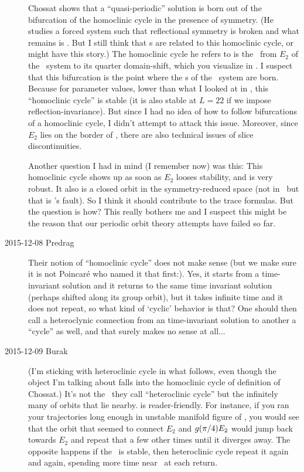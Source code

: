 \begin{description}
Chossat shows that a ``quasi-periodic'' solution is born
out of the bifurcation of the homoclinic cycle in the presence of
 symmetry.
(He studies a forced system such that reflectional symmetry is broken and
what remains is . But I still think that \rpo s are related to
this homoclinic cycle,  or  might have
this story.)
The homoclinic cycle he refers to is the
\hec\ from $E_2$ of the \KS\ system to its quarter
domain-shift, which you visualize in .
I suspect that this bifurcation is the point where the \rpo s of the
\KS\ system are born. Because for parameter values, lower than what
I looked at in , this ``homoclinic cycle'' is stable
(it is also stable at $L=22$ if we impose reflection-invariance).
But since I had no idea of how to follow bifurcations of a homoclinic
cycle, I didn't attempt to attack this issue. Moreover, since $E_2$
lies on the border of \fFslice, there are also technical issues of
slice discontinuities.

Another question I had in mind (I remember now) was this:
This homoclinic cycle shows up as soon as $E_2$ looses stability, and
is very robust. It also is a closed orbit in the symmetry-reduced
space (not in \fFslice\ but that is \fFslice's fault). So I think it
should contribute to the trace formulas. But the question is how?
This really bothers me and I suspect this might be the reason that
our periodic orbit theory attempts have failed so far.

\item[2015-12-08 Predrag]
Their notion of ``homoclinic cycle'' does not make sense (but we
make sure it is not Poincar\'e who named it that first:). Yes, it starts
from a time-invariant solution and it returns to the same time invariant
solution (perhaps shifted along its group orbit), but it takes infinite
time and it does not repeat, so what kind of `cyclic' behavior is that?
One should then call a heteroclynic connection from an time-invariant
solution to another a ``cycle'' as well, and that surely makes no sense at
all...

\item[2015-12-09 Burak]
(I'm sticking with heteroclinic cycle in what follows, even though
the object I'm talking about falls into the homoclinic cycle of
definition of Chossat.)
It's not the \hec\ they call ``heteroclinic cycle''
but the infinitely many of orbits that lie nearby.
 is reader-friendly. For instance, if you ran
your trajectories long enough in unstable manifold figure of
, you would see that the orbit that seemed to connect $E_2$
and $g(\pi/4) E_2$ would jump back towards $E_2$ and repeat that
a few other times until it diverges away. The opposite happens if the
\hec\ is stable, then heteroclinic cycle repeat it
again and again, spending more time near \eqva\ at each return.


\end{description}
